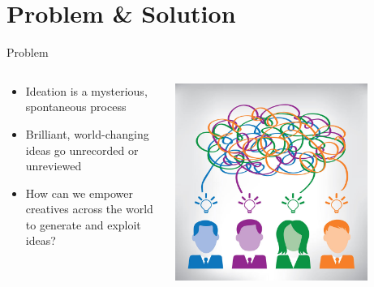 \section{Problem \& Solution}

\begin{frame}{Problem}
\begin{columns}
\begin{column}{0.5\textwidth}
\begin{itemize}
\item Ideation is a mysterious, spontaneous process
\item Brilliant, world-changing ideas go unrecorded or unreviewed
\item How can we empower creatives across the world to generate and exploit ideas?
\end{itemize}
\end{column}
\begin{column}{0.5\textwidth}  %
    \begin{center}
     \includegraphics[width=0.8\textwidth]{img/Ideation}
     \end{center}
\end{column}
\end{columns}
\end{frame}


